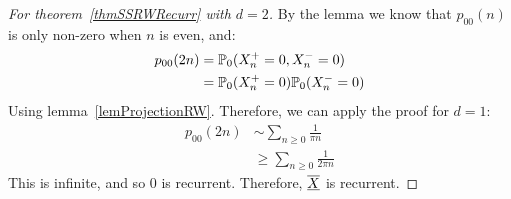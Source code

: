 \documentclass[../Main.tex]{subfiles}
\begin{document}
\begin{proof}[For theorem~\ref{thmSSRWRecurr} with $d = 2$]
    By the lemma we know that $p_{00}(n)$ is only non-zero when $n$ is even, and:
    \begin{align*}
        p_{00}(2n) &= \P_0(X_n^+ = 0, X_n^- = 0) \\
        &=\P_0(X_n^+ = 0) \P_0(X_n^- = 0) \\
    \end{align*}
    Using lemma~\ref{lemProjectionRW}. Therefore, we can apply the proof for $d = 1$:
    \begin{align*}
        p_{00}(2n) &\sim \sum_{n \geq 0}\frac{1}{\pi n} \\
        & \geq \sum_{n \geq 0} \frac{1}{2\pi n}
    \end{align*}
    This is infinite, and so $0$ is recurrent. Therefore, $\chain{X}$ is recurrent.
\end{proof}
\end{document}
